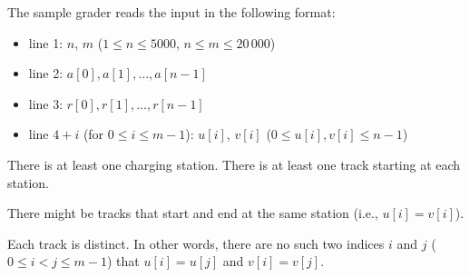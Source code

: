 The sample grader reads the input in the following format:
\begin{itemize}
\item line 1: $n$, $m$ ($1 \leq n \leq 5000$, $n \leq m \leq 20\,000$)
\item line 2: $a[0], a[1], \ldots, a[n - 1]$
\item line 3: $r[0], r[1], \ldots, r[n - 1]$
\item line $4 + i$ (for $0 \le i \le m - 1$): $u[i]$, $v[i]$ ($0 \le u[i], v[i] \le n - 1$)
\end{itemize}

There is at least one charging station. There is at least one track starting at each station.

There might be tracks that start and end at the same station (i.e., $u[i] = v[i]$).

Each track is distinct. In other words, there are no such two indices $i$ and $j$ ($0 \le i < j \le m - 1$) that $u[i] = u[j]$ and $v[i] = v[j]$.